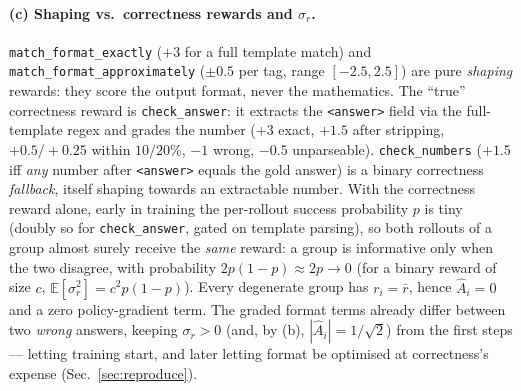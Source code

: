 \documentclass[11pt,a4paper]{article}
\begin{document}
\paragraph{(c) Shaping vs.\ correctness rewards and $\sigma_r$.}
\texttt{match\_format\_exactly} ($+3$ for a full template match) and
\texttt{match\_format\_approximately} ($\pm0.5$ per tag, range $[-2.5,2.5]$) are pure
\emph{shaping} rewards: they score the output format, never the mathematics. The ``true''
correctness reward is \texttt{check\_answer}: it extracts the \texttt{<answer>} field via the
full-template regex and grades the number ($+3$ exact, $+1.5$ after stripping, $+0.5/{+}0.25$
within $10/20\%$, $-1$ wrong, $-0.5$ unparseable). \texttt{check\_numbers} ($+1.5$ iff
\emph{any} number after \texttt{<answer>} equals the gold answer) is a binary correctness
\emph{fallback}, itself shaping towards an extractable number. With the
correctness reward alone, early in training the per-rollout success probability $p$ is tiny
(doubly so for \texttt{check\_answer}, gated on template parsing), so both
rollouts of a group almost surely receive the \emph{same} reward: a group is informative only
when the two disagree, with probability $2p(1-p)\approx2p\to0$ (for a binary reward of size
$c$, $\mathbb{E}[\sigma_r^2]=c^2p(1-p)$). Every degenerate group has $r_i=\bar r$, hence
$\hat A_i=0$ and a zero policy-gradient term. The graded format
terms already differ between two \emph{wrong} answers, keeping $\sigma_r>0$ (and, by (b),
$|\hat A_i|=1/\sqrt2$) from the first steps --- letting training start, and later letting
format be optimised at correctness's expense (Sec.~\ref{sec:reproduce}).

\end{document}
